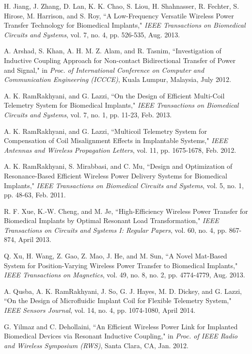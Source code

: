 \documentclass[twocolumn,10pt]{IEEEtran}
\begin{document}
\begin{thebibliography}{99}
 H. Jiang, J. Zhang, D. Lan, K. K. Chao, S. Liou, H. Shahnasser, R. Fechter, S. Hirose, M. Harrison, and S. Roy,  
``A Low-Frequency Versatile Wireless Power Transfer Technology for Biomedical Implants," \emph{IEEE Transactions on Biomedical Circuits and Systems}, vol. 7, no. 4, pp. 526-535, Aug. 2013.

   A. Arshad, S. Khan, A. H. M. Z. Alam, and R. Tasnim,  
``Investigation of Inductive Coupling Approach for Non-contact Bidirectional Transfer of Power and Signal,"  in \emph{Proc. of
International Conference on Computer and Communication Engineering (ICCCE)}, Kuala Lumpur, Malaysia, July 2012.
 
   A. K. RamRakhyani, and G. Lazzi, ``On the Design of Efficient Multi-Coil Telemetry System for Biomedical Implants,"
\emph{IEEE Transactions on Biomedical Circuits and Systems},
vol. 7, no. 1, pp. 11-23, Feb. 2013.
 
 A. K. RamRakhyani, and G. Lazzi, ``Multicoil Telemetry System for Compensation of Coil Misalignment Effects in Implantable Systems,"   \emph{IEEE Antennas and Wireless Propagation Letters}, vol. 11, pp. 1675-1678, Feb. 2012.
 
 A. K. RamRakhyani, S. Mirabbasi, and C. Mu, ``Design and Optimization of Resonance-Based Efficient Wireless Power Delivery Systems for Biomedical Implants," \emph{IEEE Transactions on Biomedical Circuits and Systems},
vol. 5, no. 1, pp.  48-63, Feb. 2011.

 R. F. Xue, K.-W. Cheng, and M. Je, ``High-Efficiency Wireless Power Transfer for Biomedical Implants by Optimal Resonant Load Transformation," \emph{IEEE Transactions on Circuits and Systems I: Regular Papers}, vol. 60, no. 4, pp. 867-874, April 2013.

 Q. Xu, H. Wang, Z. Gao, Z. Mao, J. He, and M. Sun, ``A Novel Mat-Based System for Position-Varying Wireless Power Transfer to Biomedical Implants," \emph{IEEE Transactions on Magnetics}, 
vol. 49, no. 8, no. 2, pp. 4774-4779, Aug. 2013. 

 A. Qusba, A. K. RamRakhyani, J. So, G. J. Hayes, M. D. Dickey,  and G. Lazzi, ``On the Design of Microfluidic Implant Coil for Flexible Telemetry System," \emph{IEEE Sensors Journal}, 
vol. 14, no. 4, pp. 1074-1080, April 2014.

 G. Yilmaz and C. Dehollaini, ``An Efficient Wireless Power Link for Implanted Biomedical Devices via Resonant Inductive Coupling," in \emph{Proc. of IEEE Radio and Wireless Symposium (RWS)}, Santa Clara, CA, Jan. 2012. 


\end{thebibliography}
\end{document}
